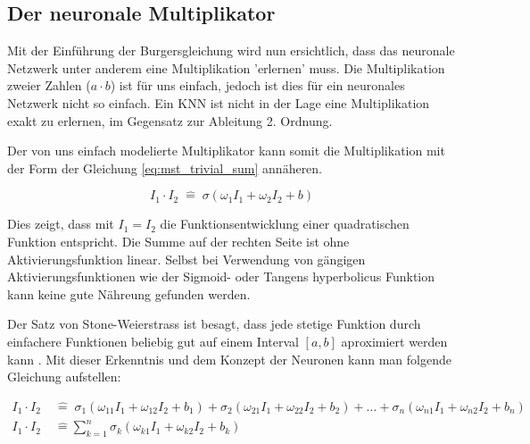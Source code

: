 \subsection{Der neuronale Multiplikator}
Mit der Einführung der Burgersgleichung wird nun ersichtlich, dass das neuronale Netzwerk unter anderem eine Multiplikation 'erlernen' muss. Die Multiplikation zweier Zahlen ($a \cdot b$) ist für uns einfach, jedoch ist dies für ein neuronales Netzwerk nicht so einfach. Ein KNN ist nicht in der Lage eine Multiplikation exakt zu erlernen, im Gegensatz zur Ableitung 2. Ordnung. 
\begin{center}
\end{center}

Der von uns einfach modelierte Multiplikator kann somit die Multiplikation mit der Form der Gleichung \eqref{eq:mst_trivial_sum} annäheren. 

\begin{equation}
I_{1} \cdot I_{2} \; \hat{=} \; \sigma \left( \omega_{1} I_1 + \omega_{2} I_2 + b \right) 
\label{eq:mst_traivial_sum}
\end{equation}

Dies zeigt, dass mit $I_1 = I_2$ die Funktionsentwicklung einer quadratischen Funktion entspricht. Die Summe auf der rechten Seite ist ohne Aktivierungsfunktion linear. Selbst bei Verwendung von gängigen Aktivierungsfunktionen wie der Sigmoid- oder Tangens hyperbolicus Funktion kann keine gute Nähreung gefunden werden. 

Der Satz von Stone-Weierstrass ist besagt, dass jede stetige Funktion durch einfachere Funktionen beliebig gut auf einem Interval $[a, b]$ aproximiert werden kann \cite{wiki:StoneWeierstrass}. Mit dieser Erkenntnis und dem Konzept der Neuronen kann man folgende Gleichung aufstellen:

\begin{align}
I_{1} \cdot I_{2} \; & \hat{=} \; \sigma_{1} \left( \omega_{11} I_1 + \omega_{12} I_2 + b_{1} \right) + \sigma_{2} \left( \omega_{21} I_1 + \omega_{22} I_2 + b_{2}  \right) + \dots  + \sigma_{n} \left( \omega_{n1} I_1 + \omega_{n2} I_2 + b_{n} \right) \\
I_{1} \cdot I_{2} \; & \hat{=} \sum_{k=1}^{n} \sigma_{k} \left( \omega_{k1} I_1 + \omega_{k2} I_2 + b_{k} \right)
\label{eq:mst_traivial_sum}
\end{align}
 
